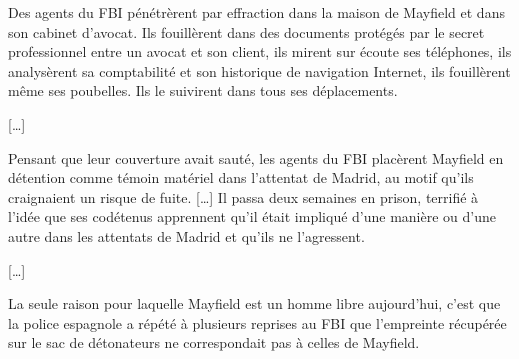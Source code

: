 Des agents du FBI pénétrèrent par effraction dans la maison de Mayfield et dans son cabinet d'avocat.
Ils fouillèrent dans des documents protégés par le secret professionnel entre un avocat et son client, ils mirent sur écoute ses téléphones, ils analysèrent sa comptabilité et son historique de navigation Internet, ils fouillèrent même ses poubelles.
Ils le suivirent dans tous ses déplacements.

[…]

Pensant que leur couverture avait sauté, les agents du FBI placèrent Mayfield en détention comme témoin matériel dans l'attentat de Madrid, au motif qu'ils craignaient un risque de fuite.
[…] %
Il passa deux semaines en prison, terrifié à l'idée que ses codétenus apprennent qu'il était impliqué d'une manière ou d'une autre dans les attentats de Madrid et qu'ils ne l'agressent.

[…]

La seule raison pour laquelle Mayfield est un homme libre aujourd'hui, c'est que la police espagnole a répété à plusieurs reprises au FBI que l'empreinte récupérée sur le sac de détonateurs ne correspondait pas à celles de Mayfield. 
